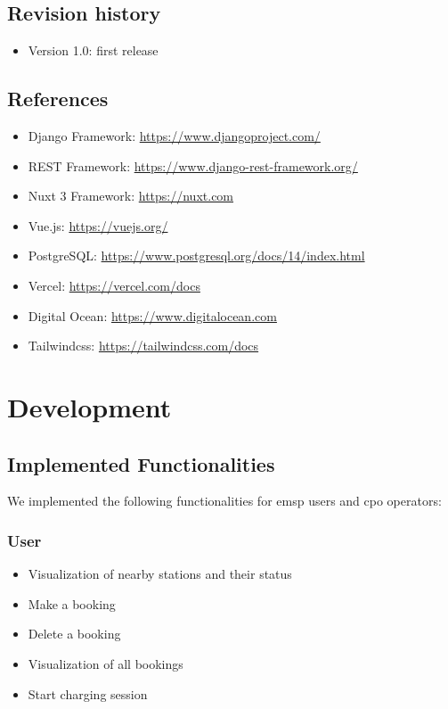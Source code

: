 \documentclass[table, 12pt]{article}
\begin{document}
\subsection{Revision history}
\begin{itemize}
    \item Version 1.0: first release
    
\end{itemize}

\subsection{References}
\begin{itemize}
    \item Django Framework: \url{https://www.djangoproject.com/}
    \item REST Framework: \url{https://www.django-rest-framework.org/}
    \item Nuxt 3 Framework: \url{https://nuxt.com}
    \item Vue.js: \url{https://vuejs.org/}
    \item PostgreSQL: \url{https://www.postgresql.org/docs/14/index.html}
    \item Vercel: \url{https://vercel.com/docs}
    \item Digital Ocean: \url{https://www.digitalocean.com}
    \item Tailwindcss: \url{https://tailwindcss.com/docs}
\end{itemize}

\newpage
\section{Development}
\subsection{Implemented Functionalities}
We implemented the following functionalities for emsp users and cpo operators:

\subsubsection*{User}
\begin{itemize}
    \item Visualization of nearby stations and their status
    \item Make a booking
    \item Delete a booking
    \item Visualization of all bookings
    \item Start charging session
\end{itemize}
\end{document}
